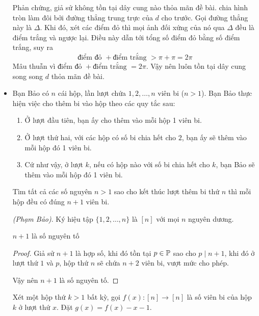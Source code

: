 \documentclass[11pt]{scrartcl}
\begin{document}
\begin{itemize}[label=, leftmargin=0em, itemsep=0.5em]
\begin{sol}
        Phản chứng, giả sử không tồn tại dây cung nào thỏa mãn đề bài. chia hình tròn làm đôi bởi đường thẳng trung trực của $d$ cho trước. Gọi đường thẳng này là $\Delta$. Khi đó, xét các điểm đỏ thì mọi ảnh đối xứng của nó qua $\Delta$ đều là điểm trắng và ngược lại. Điều này dẫn tới tổng số điểm đỏ bằng số điểm trắng, suy ra 
        \[
            \text{điểm đỏ } +  \text{điểm trắng } > \pi + \pi = 2\pi
        \]
        Mâu thuẫn vì  $\text{điểm đỏ } +  \text{điểm trắng } =2\pi$. Vậy nên luôn tồn tại dây cung song song $d$ thỏa mãn đề bài.
    \end{sol}
    \item \begin{bt}
        Bạn Bảo có $n$ cái hộp, lần lượt chứa $1,2,\dots,n$ viên bi ($n > 1$). Bạn Bảo thực hiện việc cho thêm bi vào hộp theo các quy tắc sau:
        \begin{enumerate}
            \item Ở lượt đầu tiên, bạn ấy cho thêm vào mỗi hộp 1 viên bi.
            \item Ở lượt thứ hai, với các hộp có số bi chia hết cho $2$, bạn ấy sẽ thêm vào mỗi hộp đó 1 viên bi.
            \item Cứ như vậy, ở lượt $k$, nếu có hộp nào với số bi chia hết cho $k$, bạn Bảo sẽ thêm vào mỗi hộp đó 1 viên bi.
        \end{enumerate}
        Tìm tất cả các số nguyên $n > 1$ sao cho kết thúc lượt thêm bi thứ $n$ thì mỗi hộp đều có đúng $n + 1$ viên bi.
    \end{bt}
    \begin{sol}
        \textit{(Phạm Bảo)}. Ký hiệu tập $\{1,2,\dots, n\}$ là $[n]$ với mọi $n$ nguyên dương.

         $n + 1$ là số nguyên tố 
        \begin{proof}
            Giả sử $n + 1$ là hợp số, khi đó tồn tại $p \in \mathbb{P}$ sao cho $p \mid n + 1$, khi đó ở lượt thứ $1$ và $p$, hộp thứ $n$ sẽ chứa $n + 2$ viên bi, vượt mức cho phép.

            Vậy nên $n + 1$ là số nguyên tố.
        \end{proof}
        Xét một hộp thứ $k >1$ bất kỳ, gọi $f(x): [n] \to [n]$ là số viên bi của hộp $k$ ở lượt thứ $x$. Đặt $g(x) = f(x) - x - 1$. 
        

\end{sol}
\end{itemize}
\end{document}
